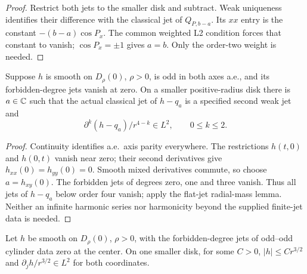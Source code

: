 \begin{proof}
\leanok
Restrict both jets to the smaller disk and subtract. Weak uniqueness
identifies their difference with the classical jet of $Q_{P,b-a}$.
Its $xx$ entry is the constant $-(b-a)\cos P_x$.
The common weighted L2 condition forces that constant to vanish;
$\cos P_x=\pm1$ gives $a=b$. Only the order-two weight is needed.
\end{proof}

\begin{lemma}
\label{lem:odd-odd-smooth-quadratic-remainder}
\leanok
Suppose $h$ is smooth on $D_\rho(0)$, $\rho>0$, is odd in both axes a.e.,
and its forbidden-degree jets vanish at zero.
On a smaller positive-radius disk there is $a\in\mathbb{C}$ such that the actual
classical jet of $h-q_a$ is a specified second weak jet and
\[
 \partial^k(h-q_a)/r^{4-k}\in L^2,\qquad 0\le k\le2.
\]
\end{lemma}

\begin{proof}
\leanok
Continuity identifies a.e.\ axis parity everywhere.
The restrictions $h(t,0)$ and $h(0,t)$ vanish near zero; their second
derivatives give $h_{xx}(0)=h_{yy}(0)=0$.
Smooth mixed derivatives commute, so choose $a=h_{xy}(0)$.
The forbidden jets of degrees zero, one and three vanish.
Thus all jets of $h-q_a$ below order four vanish; apply the flat-jet
radial-mass lemma. Neither an infinite harmonic series nor harmonicity
beyond the supplied finite-jet data is needed.
\end{proof}

\begin{lemma}
\label{lem:odd-odd-subcritical-smooth-mass}
\leanok
Let $h$ be smooth on $D_\rho(0)$, $\rho>0$, with the forbidden-degree
jets of odd--odd cylinder data zero at the center.
On one smaller disk, for some $C>0$,
$|h|\le Cr^{3/2}$ and $\partial_jh/r^{3/2}\in L^2$ for both coordinates.
\end{lemma}

